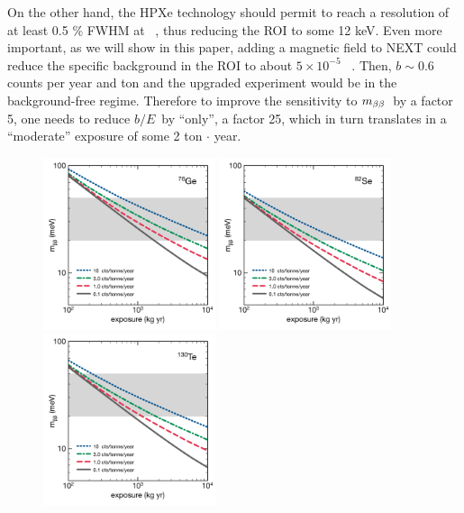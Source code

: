 On the other hand, the HPXe technology should permit to reach a resolution of at least 0.5 \% FWHM at \Qbb\ \cite{Alvarez:2012kua}, thus reducing the ROI to some 12 keV. Even more important, as we will show in this paper, adding a magnetic field to NEXT could reduce the specific background in the ROI to about $5 \times 10^{-5}$~ \ckky. Then, $b \sim 0.6$ counts per year and ton and the upgraded experiment would be in the background-free regime. Therefore to improve the sensitivity to $m_{\beta\beta}$~by a factor 5, one needs to reduce $b/E$~by ``only'', a factor 25, which in turn translates in a ``moderate'' exposure of some 2 ton $\cdot$ year. 


\begin{figure}
\centering
\includegraphics[width=0.45\textwidth]{img/FutureGe76.pdf}
\includegraphics[width=0.45\textwidth]{img/FutureSe82.pdf}
\includegraphics[width=0.45\textwidth]{img/FutureTe130.pdf}

\end{figure}
